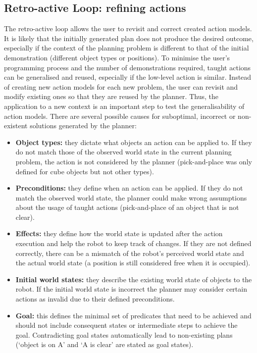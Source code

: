 \subsection{Retro-active Loop: refining actions}
The retro-active loop allows the user to revisit and correct created action models.
It is likely that the initially generated plan does not produce the desired outcome, especially if the context of the planning problem is different to that of the initial demonstration (\eg different object types or positions).
To minimise the user's programming process and the number of demonstrations required, taught actions can be generalised and reused, especially if the low-level action is similar.
Instead of creating new action models for each new problem, the user can revisit and modify existing ones so that they are reused by the planner.
Thus, the application to a new context is an important step to test the generalisability of action models.
There are several possible causes for suboptimal, incorrect or non-existent solutions generated by the planner:
\begin{itemize}
	\item \textbf{Object types:} they dictate what objects an action can be applied to. If they do not match those of the observed world state in the current planning problem, the action is not considered by the planner (\eg pick-and-place was only defined for cube objects but not other types).
	\item \textbf{Preconditions:} they define when an action can be applied. If they do not match the observed world state, the planner could make wrong assumptions about the usage of taught actions (\eg pick-and-place of an object that is not clear).
	\item \textbf{Effects:} they define how the world state is updated after the action execution and help the robot to keep track of changes. If they are not defined correctly, there can be a mismatch of the robot's perceived world state and the actual world state (\eg a position is still considered free when it is occupied).
	\item \textbf{Initial world states:} they describe the existing world state of objects to the robot. If the initial world state is incorrect the planner may consider certain actions as invalid due to their defined preconditions.
	\item \textbf{Goal:} this defines the minimal set of predicates that need to be achieved and should not include consequent states or intermediate steps to achieve the goal. Contradicting goal states automatically lead to non-existing plans (\eg `object is on A' and `A is clear' are stated as goal states).
\end{itemize}

